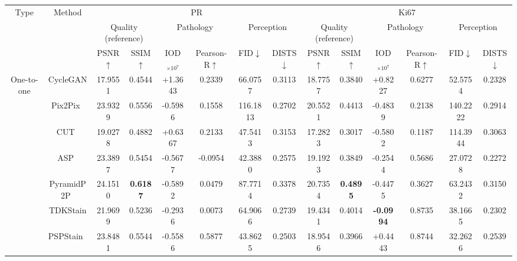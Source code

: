 \documentclass[journal,twoside,web]{ieeecolor}
\begin{document}
\begin{table}[ht]
{\begin{tabular}{c|c|cc|cc|cc|cc|cc|cc}
       \multirow{3}{*}{Type} &\multirow{3}{*}{Method} & 
      \multicolumn{6}{c|}{PR} & \multicolumn{6}{c}{Ki67} \\
      \cline{3-14}
      && \multicolumn{2}{c|}{Quality (reference)} & \multicolumn{2}{c|}{Pathology} & \multicolumn{2}{c|}{Perception} & 
      \multicolumn{2}{c|}{Quality (reference)} & \multicolumn{2}{c|}{Pathology} & \multicolumn{2}{c}{Perception} \\
      \cline{3-14}
      && PSNR$\uparrow$ & SSIM$\uparrow$ & IOD$_{\times10^7}$ & Pearson-R$\uparrow$ & FID$\downarrow$ & DISTS$\downarrow$ & PSNR$\uparrow$ & SSIM$\uparrow$ & IOD$_{\times10^7}$ & Pearson-R$\uparrow$ & FID$\downarrow$ & DISTS$\downarrow$ \\
      \hline
     \multirow{9}{*}{One-to-one} 
     & CycleGAN~\cite{zhu2017unpaired} & 17.9551 & 0.4544 & +1.3643 & 0.2339 & 66.0757 & 0.3113 & 18.7757 & 0.3840 & +0.8227 & 0.6277 & 52.5754 & 0.2328 \\
     & Pix2Pix~\cite{isola2017image} & 23.9329 & 0.5556 & -0.5986 & 0.1558 & 116.1813 & 0.2702 & 20.5521 & 0.4413 & -0.4839 & 0.2138 & 140.2222 & 0.2914 \\
      &CUT~\cite{park2020contrastive} & 19.0278 & 0.4882 & +0.6367 & 0.2133 & 47.5413 & 0.3153 & 17.2823 & 0.3017 & -0.5802 & 0.1187 & 114.3944 & 0.3063 \\
     & ASP~\cite{li2023adaptive} & 23.3897 & 0.5454 & -0.5677 & -0.0954 & 42.3880 & 0.2575 & 19.1923 & 0.3849 & -0.2544 & 0.5686 & 27.0728 & 0.2272 \\
      &PyramidP2P~\cite{liu2022bci} & 24.1510 & \textbf{0.6187} & -0.5892 & 0.0479 & 87.7714 & 0.3378 & 20.7354 & \textbf{0.4895} & -0.4475 & 0.3627 & 63.2432 & 0.3150 \\
    &  TDKStain~\cite{peng2024advancing} & 21.9699 & 0.5236 & -0.2936 & 0.0073 & 64.9066 & 0.2739 & 19.4341 & 0.4014 & \textbf{-0.0994} & 0.8735 & 38.1665 & 0.2302 \\
    &  PSPStain~\cite{chen2024pathological} & 23.8481 & 0.5544 & -0.5586 & 0.5877 & 43.8625 & 0.2503 & 18.9546 & 0.3966 & +0.4443 & 0.8744 & 32.2626 & 0.2539 \\




\end{tabular}}
\end{table}
\end{document}
